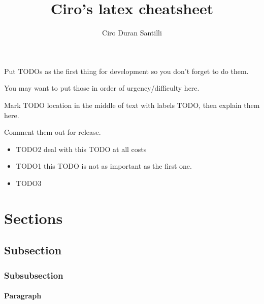 \documentclass[12pt]{article}
\title{Ciro's latex cheatsheet}
\author{Ciro Duran Santilli}
\begin{document}
\begin{remark}
	Put TODOs as the first \label{TODO2} thing for development so you don't forget to do them.
	
	You may want to put those in order of urgency/difficulty here.
	
	Mark TODO location in \label{TODO1} the middle of text with labels TODO, then explain them here.
	
	Comment them out for release.
\end{remark}

\begin{itemize}
  \item TODO2 deal with this TODO at all costs
  \item TODO1 this TODO is not as important as the first one.
  \item TODO3
\end{itemize}

\newpage



\tableofcontents
\newpage

\section{Sections}\label{secSec}

\subsection{Subsection}\label{secSsec}

\subsubsection{Subsubsection}\label{secSssec}

\paragraph{Paragraph}
\end{document}
